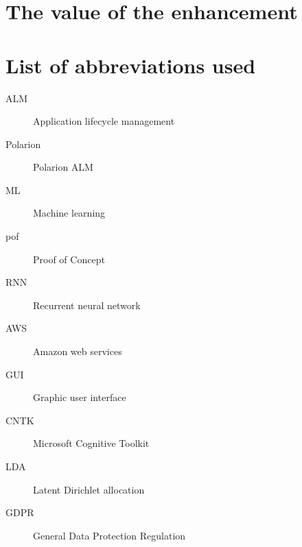 \documentclass[thesis=M,english]{FITthesis}[2012/06/26]
\begin{document}
\chapter{The value of the enhancement}

\begin{conclusion}
\end{conclusion}




\appendix

\chapter{List of abbreviations used}

\printglossaries

\begin{description}
	\item[ALM] Application lifecycle management
	\item[Polarion] Polarion ALM
	\item[ML] Machine learning 
	\item[pof] Proof of Concept
	\item[RNN] Recurrent neural network
	\item[AWS] Amazon web services
	\item[GUI] Graphic user interface
	\item[CNTK] Microsoft Cognitive Toolkit
	\item[LDA] Latent Dirichlet allocation
	\item[GDPR] General Data Protection Regulation
\end{description}
\end{document}
